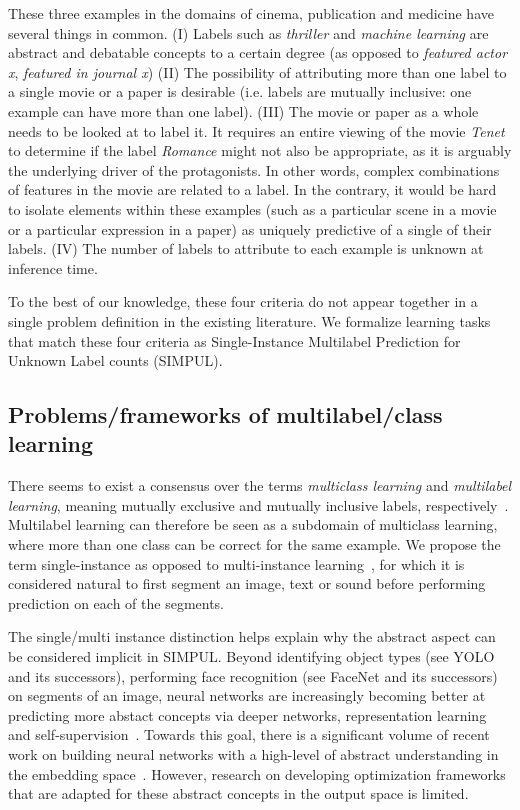 These three examples in the domains of
cinema, publication and medicine have several things in common. (I) Labels
such as \textit{thriller} and \textit{machine learning} are abstract and
debatable concepts to a certain degree (as opposed to \textit{featured actor
x}, \textit{featured in journal x}) (II) The possibility of attributing more
than one label to a single movie or a paper is desirable (i.e. labels are
mutually inclusive: one example can have more than one label). (III) The movie
or paper as a whole needs to be looked at to label it. It requires an entire
viewing of the movie \textit{Tenet} to determine if the label \textit{Romance}
might not also be appropriate, as it is arguably the underlying driver of the
protagonists. In other words, complex combinations of features in the movie
are related to a label. In the contrary, it would be hard to isolate elements
within these examples (such as a particular scene in a movie or a particular
expression in a paper) as uniquely predictive of a single of their labels.
(IV) The number of labels to attribute to each example is unknown at inference
time.

To the best of our knowledge, these four criteria do not appear together in a
single problem definition in the existing literature. We formalize learning
tasks that match these four criteria as Single-Instance Multilabel Prediction
for Unknown Label counts (SIMPUL).

\subsection{Problems/frameworks of multilabel/class learning}
There seems to exist a consensus over the terms \emph{multiclass learning} and
\emph{multilabel learning}, meaning mutually exclusive and mutually inclusive
labels, respectively~\cite{multilabelMethods}. Multilabel learning can
therefore be seen as a subdomain of multiclass learning, where more than one
class can be correct for the same example. We propose the term single-instance
as opposed to multi-instance learning~\citep[e.g.,][]{multiInstance,
multiInstanceMultiLabel}, for which it is considered natural to first segment
an image, text or sound before performing prediction on each of the segments.

The single/multi instance distinction helps explain why the abstract aspect
can be considered implicit in SIMPUL. Beyond identifying object types (see
YOLO \cite{YOLO} and its successors), performing face recognition (see FaceNet
\cite{FaceNet} and its successors) on segments of an image, neural networks
are increasingly becoming better at predicting more abstact concepts via
deeper networks, representation learning and self-supervision~\citep[see,
e.g.,][]{SS,Rep}. Towards this goal, there is a significant volume of recent
work on building neural networks with a high-level of abstract understanding
in the embedding space~. However, research on developing optimization
frameworks that are adapted for these abstract concepts in the output space is
limited.

